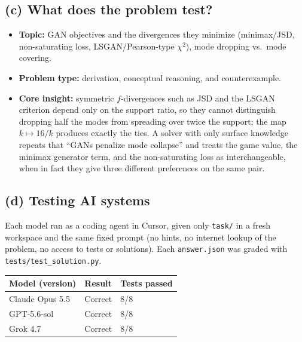 \subsection{(c) What does the problem test?}

\begin{itemize}
  \item \textbf{Topic:} GAN objectives and the divergences they minimize
        (minimax/JSD, non-saturating loss, LSGAN/Pearson-type \(\chi^2\)),
        mode dropping vs.\ mode covering.
  \item \textbf{Problem type:} derivation, conceptual reasoning, and
        counterexample.
  \item \textbf{Core insight:} symmetric \(f\)-divergences such as JSD and
        the LSGAN criterion depend only on the support ratio, so they cannot
        distinguish dropping half the modes from spreading over twice the
        support; the map \(k\mapsto16/k\) produces exactly the ties. A solver
        with only surface knowledge repeats that ``GANs penalize mode
        collapse'' and treats the game value, the minimax generator term, and
        the non-saturating loss as interchangeable, when in fact they give
        three different preferences on the same pair.
\end{itemize}

\subsection{(d) Testing AI systems}

Each model ran as a coding agent in Cursor, given only \texttt{task/} in a
fresh workspace and the same fixed prompt (no hints, no internet lookup of
the problem, no access to tests or solutions). Each \texttt{answer.json} was
graded with \texttt{tests/test\_solution.py}.

\begin{center}
\begin{tabular}{@{}lll@{}}
\toprule
Model (version) & Result & Tests passed\\
\midrule
Claude Opus 5.5 & Correct & 8/8\\
GPT-5.6-sol & Correct & 8/8\\
Grok 4.7 & Correct & 8/8\\
\bottomrule
\end{tabular}
\end{center}

